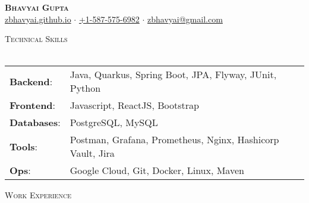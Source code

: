 \documentclass[a4paper]{article}
\newcommand{\lineunder} {
    \vspace*{-8pt} \\
    \hspace*{-18pt} \hrulefill \hspace*{-6pt} \\
}
\newcommand{\header} [1] {
    \vspace*{5pt}
    {\hspace*{-18pt}\vspace*{6pt} \large\textsc{#1}}
    \vspace*{-6pt} \lineunder
}
\begin{document}
\vspace*{-40pt}


\vspace*{-10pt}
\begin{center}
    \textbf{\Huge \scshape {Bhavyai Gupta}}\\
    \href{https://zbhavyai.github.io}{zbhavyai.github.io} $\cdot$ \href{tel:+15875756982}{+1-587-575-6982} $\cdot$ \href{mailto:zbhavyai@gmail.com}{zbhavyai@gmail.com} \\
\end{center}


\header{Technical Skills}

\begin{tabular}{ l l }
    \textbf{Backend}:   & Java, Quarkus, Spring Boot, JPA, Flyway, JUnit, Python                        \\
    \textbf{Frontend}:  & Javascript, ReactJS, Bootstrap                                                \\
    \textbf{Databases}: & PostgreSQL, MySQL                                                             \\
    \textbf{Tools}:     & Postman, Grafana, Prometheus, Nginx, Hashicorp Vault, Jira                    \\
    \textbf{Ops}:       & Google Cloud, Git, Docker, Linux, Maven                                       \\
\end{tabular}
\vspace{2mm}


\header{Work Experience}
\end{document}

